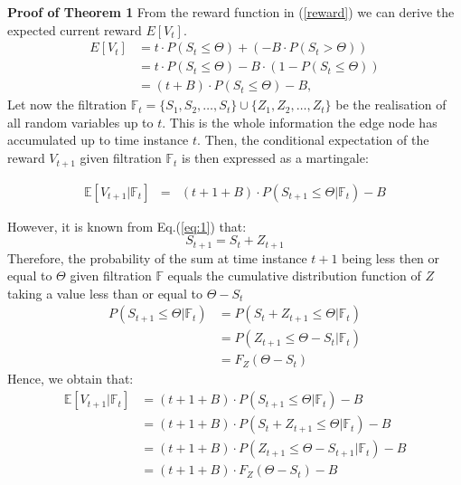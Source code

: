 \documentclass{mpaper}
\begin{document}

\textbf{Proof of Theorem 1}
From the reward function in (\ref{reward}) we can derive the expected current reward $E[V_t]$. 
\begin{equation}
\begin{split}
    E[V_t] & = t \cdot P(S_t \leq \Theta) + (-B \cdot P(S_t > \Theta))\\
    & = t \cdot P(S_t \leq \Theta) - B \cdot (1 - P(S_t \leq \Theta))\\
    & = (t + B) \cdot P(S_t \leq \Theta) - B,
\end{split}
\end{equation}
Let now the filtration $\mathbb{F}_{t} = \{S_{1}, S_{2}, \ldots, S_{t}\} \cup \{Z_{1}, Z_{2}, \ldots, Z_{t}\}$ be the realisation of all random variables up to $t$. This is the whole information the edge node has accumulated up to time instance $t$. 
Then, the conditional expectation of the reward $V_{t+1}$ given filtration $\mathbb{F}_{t}$ is then expressed as a martingale:

\begin{eqnarray}
    \mathbb{E}[V_{t+1}|\mathbb{F}_{t}] & = & (t + 1 + B) \cdot P(S_{t+1} \leq \Theta | \mathbb{F}_t) - B
\end{eqnarray}

However, it is known from Eq.(\ref{eq:1}) that:
\begin{equation}
    S_{t+1} = S_t + Z_{t+1}
\end{equation}
Therefore, the probability of the sum at time instance $t+1$ being less then or equal to $\Theta$ given filtration $\mathbb{F}$ equals the cumulative distribution function of $Z$ taking a value less than or equal to $\Theta - S_t$ 
\begin{align*}
    P(S_{t+1} \leq \Theta | \mathbb{F}_t) &= P(S_t + Z_{t+1} \leq \Theta| \mathbb{F}_t)\\
                           &= P(Z_{t+1}\leq\Theta-S_t| \mathbb{F}_t)\\
                           &= F_{Z}(\Theta - S_t)
\end{align*}
Hence, we obtain that:
\begin{align*}
    \mathbb{E}[V_{t+1}|\mathbb{F}_{t}] &= (t + 1 + B) \cdot P(S_{t+1} \leq \Theta | \mathbb{F}_t) - B\\
    &=(t + 1 + B) \cdot P(S_{t}+Z_{t+1} \leq \Theta | \mathbb{F}_{t}) - B\\
    &=(t + 1 + B) \cdot P(Z_{t+1} \leq \Theta-S_{t+1} | \mathbb{F}_{t}) - B\\
    &=(t + 1 + B) \cdot F_{Z}(\Theta-S_{t}) - B\\
\end{align*}
\end{document}
